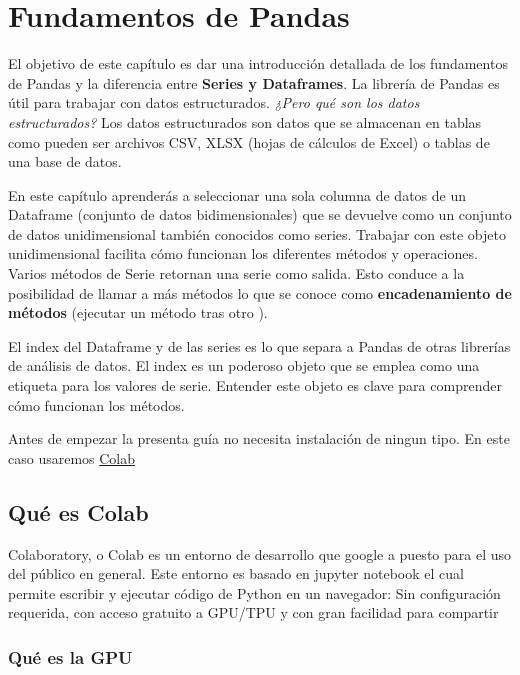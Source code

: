 \documentclass[
]{book}
\begin{document}
\hypertarget{intro}{%
\chapter{Fundamentos de Pandas}\label{intro}}

El objetivo de este capítulo es dar una introducción detallada de los fundamentos de Pandas y la diferencia entre \textbf{Series y Dataframes}. La librería de Pandas es útil para trabajar con datos estructurados. \emph{¿Pero qué son los datos estructurados?} Los datos estructurados son datos que se almacenan en tablas como pueden ser archivos CSV, XLSX (hojas de cálculos de Excel) o tablas de una base de datos.

En este capítulo aprenderás a seleccionar una sola columna de datos de un Dataframe (conjunto de datos bidimensionales) que se devuelve como un conjunto de datos unidimensional también conocidos como series. Trabajar con este objeto unidimensional facilita cómo funcionan los diferentes métodos y operaciones. Varios métodos de Serie retornan una serie como salida. Esto conduce a la posibilidad de llamar a más métodos lo que se conoce como \textbf{encadenamiento de métodos} (ejecutar un método tras otro ).

El index del Dataframe y de las series es lo que separa a Pandas de otras librerías de análisis de datos. El index es un poderoso objeto que se emplea como una etiqueta para los valores de serie. Entender este objeto es clave para comprender cómo funcionan los métodos.

Antes de empezar la presenta guía no necesita instalación de ningun tipo. En este caso usaremos \href{https://colab.research.google.com/notebooks/intro.ipynb\#recent=true}{Colab}

\hypertarget{quuxe9-es-colab}{%
\section{Qué es Colab}\label{quuxe9-es-colab}}

Colaboratory, o Colab es un entorno de desarrollo que google a puesto para el uso del público en general. Este entorno es basado en jupyter notebook el cual permite escribir y ejecutar código de Python en un navegador: Sin configuración requerida, con acceso gratuito a GPU/TPU y con gran facilidad para compartir

\hypertarget{quuxe9-es-la-gpu}{%
\subsection{Qué es la GPU}\label{quuxe9-es-la-gpu}}
\end{document}
